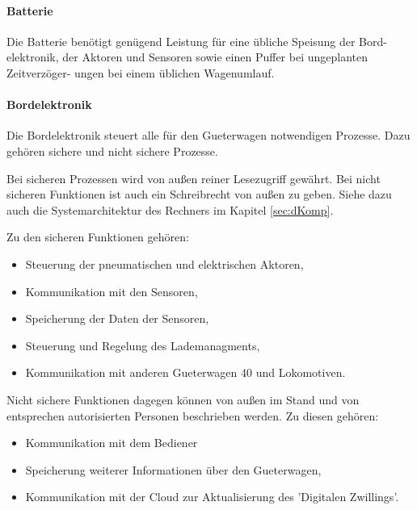 \paragraph{Batterie}\label{sec:Batterie}
Die Batterie benötigt genügend Leistung für eine übliche Speisung der Bord- elektronik, der Aktoren und Sensoren sowie einen Puffer bei ungeplanten Zeitverzöger- ungen bei einem üblichen Wagenumlauf.
\paragraph{Bordelektronik}
Die Bordelektronik steuert alle für den \gls{Gueterwagen} notwendigen Prozesse. Dazu gehören sichere und nicht sichere Prozesse.\par
Bei sicheren Prozessen wird von außen reiner Lesezugriff gewährt. Bei nicht sicheren Funktionen ist auch ein Schreibrecht von außen zu geben. Siehe dazu auch die Systemarchitektur des Rechners im Kapitel \ref{sec:dKomp}.\par
Zu den sicheren Funktionen gehören:
\begin{itemize}
    \item Steuerung der pneumatischen und elektrischen Aktoren,
    \item Kommunikation mit den Sensoren,
    \item Speicherung der Daten der Sensoren,
    \item Steuerung und Regelung des Lademanagments,
    \item Kommunikation mit anderen \gls{Gueterwagen 40} und Lokomotiven.
\end{itemize}
Nicht sichere Funktionen dagegen können von außen im Stand und von entsprechen autorisierten Personen beschrieben werden. Zu diesen gehören:
\begin{itemize}
    \item Kommunikation mit dem Bediener
    \item Speicherung weiterer Informationen über den \gls{Gueterwagen},
    \item Kommunikation mit der Cloud zur Aktualisierung des 'Digitalen Zwillings'.
\end{itemize}